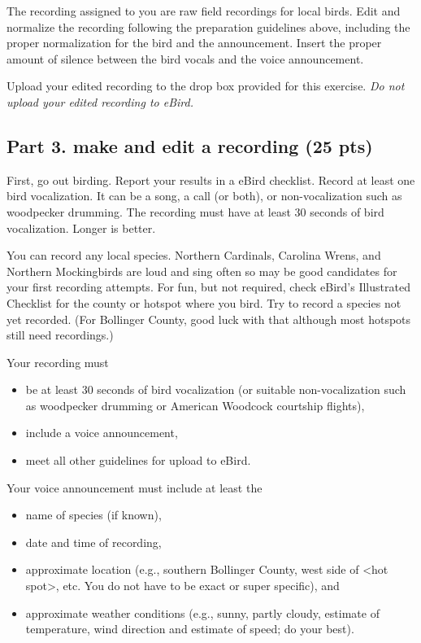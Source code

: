 \documentclass[12pt]{article}
\begin{document}
The recording assigned to you are raw field recordings for local birds. Edit and normalize the recording following the preparation guidelines above, including the proper normalization for the bird and the announcement. Insert the proper amount of silence between the bird vocals and the voice announcement.  

Upload your edited recording to the drop box provided for this exercise. \emph{Do not upload your edited recording to eBird.}


\subsection*{Part 3. make and edit a recording (25 pts)}

First, go out birding. Report your results in a eBird checklist. Record at least one bird vocalization. It can be a song, a call (or both), or non-vocalization such as woodpecker drumming. The recording must have at least 30 seconds of bird vocalization. Longer is better.

You can record any local species. Northern Cardinals, Carolina Wrens, and Northern Mockingbirds are loud and sing often so may be good candidates for your first recording attempts. For fun, but not required, check eBird's Illustrated Checklist for the county or hotspot where you bird. Try to record a species not yet recorded. (For Bollinger County, good luck with that although most hotspots still need recordings.)

Your recording must
\begin{itemize}
\item be at least 30 seconds of bird vocalization (or suitable non-vocalization such as woodpecker drumming or American Woodcock courtship flights),

\item include a voice announcement,

\item meet all other guidelines for upload to eBird.
\end{itemize}

Your voice announcement must include at least the

\begin{itemize}
\item name of species (if known),
\item date and time of recording,
\item approximate location (e.g., southern Bollinger County, west side of <hot spot>, etc. You do not have to be exact or super specific), and
\item approximate weather conditions (e.g., sunny, partly cloudy, estimate of temperature, wind direction and estimate of speed; do your best).
\end{itemize}
\end{document}

